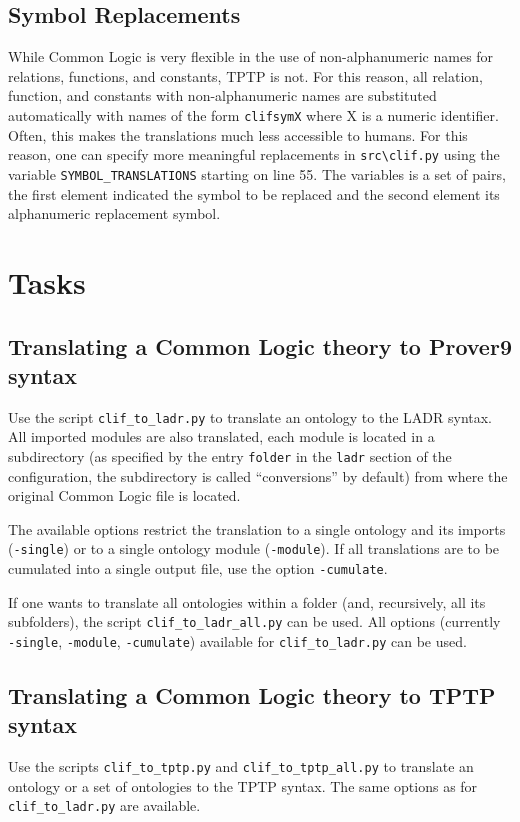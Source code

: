 \documentclass{article}
\begin{document}
\subsection{Symbol Replacements}

While Common Logic is very flexible in the use of non-alphanumeric names for relations, functions, and constants, TPTP is not. For this reason, all relation, function, and constants with non-alphanumeric names are substituted automatically with names of the form \texttt{clifsymX} where X is a numeric identifier. Often, this makes the translations much less accessible to humans. For this reason, one can specify more meaningful replacements in \texttt{src\textbackslash clif.py} using the variable \texttt{SYMBOL\_TRANSLATIONS} starting on line 55. The variables is a set of pairs, the first element indicated the symbol to be replaced and the second element its alphanumeric replacement symbol.

\section{Tasks}

\subsection{Translating a Common Logic theory to Prover9 syntax}

Use the script \texttt{clif\_to\_ladr.py} to translate an ontology to the LADR syntax.  
All imported modules are also translated, each module is located in a subdirectory (as specified by the entry \texttt{folder} in the \texttt{ladr} section of the configuration, the subdirectory is called ``conversions'' by default) from where the original Common Logic file is located.

The available options restrict the translation to a single ontology and its imports (\texttt{-single}) or to a single ontology module (\texttt{-module}). If all translations are to be cumulated into a single output file, use the option \texttt{-cumulate}.

If one wants to translate all ontologies within a folder (and, recursively, all its subfolders), the script \texttt{clif\_to\_ladr\_all.py} can be used. All options (currently \texttt{-single}, \texttt{-module}, \texttt{-cumulate}) available for \texttt{clif\_to\_ladr.py} can be used.


\subsection{Translating a Common Logic theory to TPTP syntax}

Use the scripts \texttt{clif\_to\_tptp.py} and \texttt{clif\_to\_tptp\_all.py} to translate an ontology or a set of ontologies to the TPTP syntax. The same options as for \texttt{clif\_to\_ladr.py} are available. 
\end{document}
